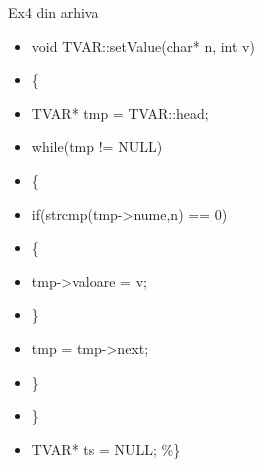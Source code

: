 \documentclass[pdf]{beamer}
\begin{document}
\begin{frame}{Ex4 din arhiva}
\begin{itemize}
\item \hspace{4mm}
	  void TVAR::setValue(char* n, int v)
\item \hspace{4mm}
	  \{
\item \hspace{6mm}
	    TVAR* tmp = TVAR::head;
\item \hspace{6mm}
	    while(tmp != NULL)
\item \hspace{6mm}
	    \{
\item \hspace{8mm}
	      if(strcmp(tmp->nume,n) == 0)
\item \hspace{8mm}
	      \{
\item \hspace{12mm}
		tmp->valoare = v;
\item \hspace{8mm}
	      \}
\item \hspace{8mm}
	      tmp = tmp->next;
\item \hspace{6mm}
	    \}
\item \hspace{4mm} 
	  \}
\item \hspace{2mm}
	TVAR* ts = NULL;
\%\}
\end{itemize}
\end{frame}
\end{document}
